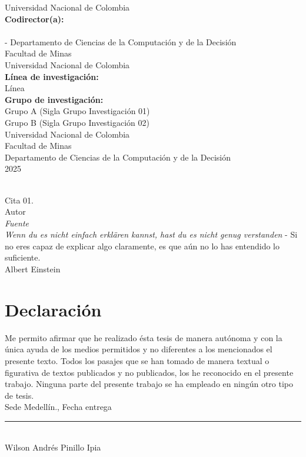 \documentclass[10pt,spanish,fleqn,openany,twoside,letterpaper]{book}
\newcommand{\studentname}{}
\newcommand{\submissiondate}{}
\newcommand{\resgroupone}{}
\newcommand{\resgrouptwo}{}
\newcommand{\researchtopic}{}
\newcommand{\codirector}{} %
\newcommand{\codirectortitle}{} %
\newcommand{\issuedate}{}
\newcommand{\sede}{}
\newcommand{\department}{}
\newcommand{\faculty}{}
\newcommand{\university}{Universidad Nacional de Colombia}
\renewcommand{\studentname}{Wilson Andrés Pinillo Ipia}
\renewcommand{\issuedate}{2025}
\renewcommand{\submissiondate}{Fecha entrega}
\renewcommand{\resgroupone}{Grupo A (Sigla Grupo Investigación 01) }
\renewcommand{\resgrouptwo}{Grupo B (Sigla Grupo Investigación 02) }
\renewcommand{\researchtopic}{Línea}
\renewcommand{\sede}{Sede Medellín}
\renewcommand{\department}{Departamento de Ciencias de la Computación y de la Decisión}
\renewcommand{\faculty}{Facultad de Minas}
\begin{document}
{\begin{center}
\university \\ 
\vspace{0.5cm}
\textbf{Codirector(a):} \\
\codirector \\
\codirectortitle \; - \department \\
\faculty \\
\university 
\vspace{1.5cm} \\
\textbf{Línea de investigación:} \\ 
\researchtopic\\
\textbf{Grupo de investigación:} \\
\resgroupone \\
\resgrouptwo \\
\vspace{1.5cm} 
\university \\
\faculty \\
\department \\
\issuedate
\end{center}

\newpage
\thispagestyle{empty}
\begin{flushright}
\begin{minipage}{12.5cm}
\noindent
\\[10em]
{\Large Cita 01.}
\\[3em]
Autor
\\ \textit{Fuente}
\\[10em]
{\Large \textit{Wenn du es nicht einfach erkl\"{a}ren kannst, hast du es nicht genug verstanden} - Si no eres capaz de explicar algo claramente, es que aún no lo has entendido lo suficiente.}
\\[3em]
Albert Einstein
\end{minipage}
\end{flushright} 

\newpage
\chapter*{\sffamily Declaración}
\par Me permito afirmar que he realizado ésta tesis de manera autónoma y con la única ayuda de los medios permitidos y no diferentes a los mencionados el presente texto. Todos los pasajes que se han tomado de manera textual o figurativa de textos publicados y no publicados, los he reconocido en el presente trabajo. Ninguna parte del presente trabajo se ha empleado en ningún otro tipo de tesis. 
\\[1em]
\sede., \submissiondate
\\[6em]
\rule{6cm}{0.5pt}\\
\studentname
}
\end{document}
